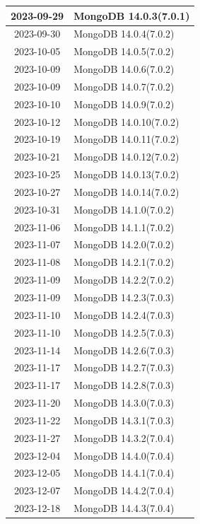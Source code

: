 \documentclass[../main.tex]{subfiles}
\begin{document}
\begin{table}[h]
\begin{minipage}{0.45\textwidth}
\begin{tabular}{|c|l|}
    2023-09-29 & MongoDB 14.0.3(7.0.1) \\ \hline  
    2023-09-30 & MongoDB 14.0.4(7.0.2) \\ \hline  
    2023-10-05 & MongoDB 14.0.5(7.0.2) \\ \hline   
    2023-10-09 & MongoDB 14.0.6(7.0.2) \\ \hline   
    2023-10-09 & MongoDB 14.0.7(7.0.2) \\ \hline   
    2023-10-10 & MongoDB 14.0.9(7.0.2) \\ \hline  
    2023-10-12 & MongoDB 14.0.10(7.0.2) \\ \hline  
    2023-10-19 & MongoDB 14.0.11(7.0.2) \\ \hline 
    2023-10-21 & MongoDB 14.0.12(7.0.2) \\ \hline  
    2023-10-25 & MongoDB 14.0.13(7.0.2) \\ \hline  
    2023-10-27 & MongoDB 14.0.14(7.0.2) \\ \hline 
    2023-10-31 & MongoDB 14.1.0(7.0.2) \\ \hline 
    2023-11-06 & MongoDB 14.1.1(7.0.2) \\ \hline  
    2023-11-07 & MongoDB 14.2.0(7.0.2) \\ \hline  
    2023-11-08 & MongoDB 14.2.1(7.0.2) \\ \hline  
    2023-11-09 & MongoDB 14.2.2(7.0.2) \\ \hline  
    2023-11-09 & MongoDB 14.2.3(7.0.3) \\ \hline  
    2023-11-10 & MongoDB 14.2.4(7.0.3) \\ \hline  
    2023-11-10 & MongoDB 14.2.5(7.0.3) \\ \hline  
    2023-11-14 & MongoDB 14.2.6(7.0.3) \\ \hline  
    2023-11-17 & MongoDB 14.2.7(7.0.3) \\ \hline  
    2023-11-17 & MongoDB 14.2.8(7.0.3) \\ \hline  
    2023-11-20 & MongoDB 14.3.0(7.0.3) \\ \hline  
    2023-11-22 & MongoDB 14.3.1(7.0.3) \\ \hline  
    2023-11-27 & MongoDB 14.3.2(7.0.4) \\ \hline
    2023-12-04 & MongoDB 14.4.0(7.0.4) \\ \hline  
    2023-12-05 & MongoDB 14.4.1(7.0.4) \\ \hline  
    2023-12-07 & MongoDB 14.4.2(7.0.4) \\ \hline  
    2023-12-18 & MongoDB 14.4.3(7.0.4) \\ \hline  

\end{tabular}
\end{minipage}
\end{table}
\end{document}
